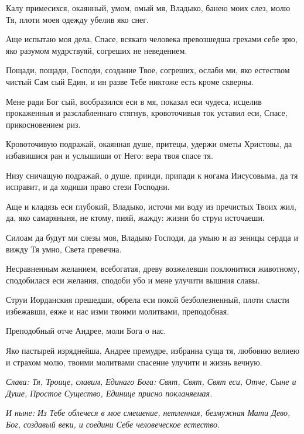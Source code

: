 Калу примесихся, окаянный, умом, омый мя, Владыко, банею моих слез, молю Тя, плоти моея одежду убелив яко снег.

Аще испытаю моя дела, Спасе, всякаго человека превозшедша грехами себе зрю, яко разумом мудрствуяй, согреших не неведением.

Пощади, пощади, Господи, создание Твое, согреших, ослаби ми, яко естеством чистый Сам сый Един, и ин разве Тебе никтоже есть кроме скверны.

Мене ради Бог сый, вообразился еси в мя, показал еси чудеса, исцелив прокаженныя и разслабленнаго стягнув, кровоточивыя ток уставил еси, Спасе, прикосновением риз.

Кровоточивую подражай, окаянная душе, притецы, удержи ометы Христовы, да избавишися ран и услышиши от Него: вера твоя спасе тя.

Низу сничащую подражай, о душе, прииди, припади к ногама Иисусовыма, да тя исправит, и да ходиши право стези Господни.

Аще и кладязь еси глубокий, Владыко, источи ми воду из пречистых Твоих жил, да, яко самаряныня, не ктому, пияй, жажду: жизни бо струи источаеши.

Силоам да будут ми слезы моя, Владыко Господи, да умыю и аз зеницы сердца и вижду Тя умно, Света превечна.


Несравненным желанием, всебогатая, древу возжелевши поклонитися животному, сподобилася еси желания, сподоби убо и мене улучити вышния славы.


Струи Иорданския прешедши, обрела еси покой безболезненный, плоти сласти избежавши, еяже и нас изми твоими молитвами, преподобная.

Преподобный отче Андрее, моли Бога о нас.

Яко пастырей изряднейша, Андрее премудре, избранна суща тя, любовию велиею и страхом молю, твоими молитвами спасение улучити и жизнь вечную.

\itshape Слава\normalfont{}: Тя, Троице, славим, Единаго Бога: Свят, Свят, Свят еси, Отче, Сыне и Душе, Простое Существо, Единице присно покланяемая.

\itshape И ныне\normalfont{}: Из Тебе облечеся в мое смешение, нетленная, безмужная Мати Дево, Бог, создавый веки, и соедини Себе человеческое естество. 



